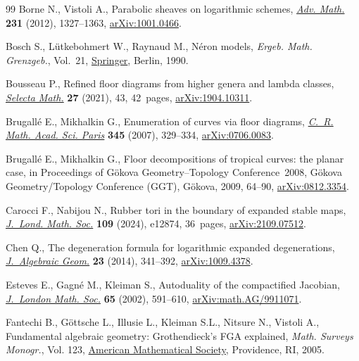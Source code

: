 \documentclass[pdftex]{sigma}
\numberwithin{equation}{section}
\theoremstyle{definition}
\begin{document}
\begin{thebibliography}{99}
Borne N., Vistoli A., Parabolic sheaves on logarithmic schemes,
 \href{https://doi.org/10.1016/j.aim.2012.06.015}{\textit{Adv. Math.}}
 \textbf{231} (2012), 1327--1363,
 \href{http://arxiv.org/abs/1001.0466}{arXiv:1001.0466}.

Bosch S., L\"utkebohmert W., Raynaud M., N\'eron models, \textit{Ergeb. Math.
 Grenzgeb.}, Vol.~21,
 \href{https://doi.org/10.1007/978-3-642-51438-8}{Springer}, Berlin, 1990.

Bousseau P., Refined floor diagrams from higher genera and lambda classes,
 \href{https://doi.org/10.1007/s00029-021-00667-w}{\textit{Selecta Math.}}
 \textbf{27} (2021), 43, 42~pages,
 \href{http://arxiv.org/abs/1904.10311}{arXiv:1904.10311}.

Brugall\'e E., Mikhalkin G., Enumeration of curves via floor diagrams,
 \href{https://doi.org/10.1016/j.crma.2007.07.026}{\textit{C.~R. Math. Acad.
 Sci. Paris}} \textbf{345} (2007), 329--334,
 \href{http://arxiv.org/abs/0706.0083}{arXiv:0706.0083}.

Brugall\'e E., Mikhalkin G., Floor decompositions of tropical curves: the
 planar case, in Proceedings of {G}\"okova {G}eometry--{T}opology
 {C}onference~2008, G\"okova Geometry/Topology Conference (GGT), G\"okova,
 2009, 64--90, \href{http://arxiv.org/abs/0812.3354}{arXiv:0812.3354}.

Carocci F., Nabijou N., Rubber tori in the boundary of expanded stable maps,
 \href{https://doi.org/10.1112/jlms.12874}{\textit{J.~Lond. Math. Soc.}}
 \textbf{109} (2024), e12874, 36~pages,
 \href{http://arxiv.org/abs/2109.07512}{arXiv:2109.07512}.

Chen Q., The degeneration formula for logarithmic expanded degenerations,
 \href{https://doi.org/10.1090/S1056-3911-2013-00614-1}{\textit{J.~Algebraic
 Geom.}} \textbf{23} (2014), 341--392,
 \href{http://arxiv.org/abs/1009.4378}{arXiv:1009.4378}.

Esteves E., Gagn\'e M., Kleiman S., Autoduality of the compactified {J}acobian,
 \href{https://doi.org/10.1112/S002461070100309X}{\textit{J.~London Math.
 Soc.}} \textbf{65} (2002), 591--610,
 \href{http://arxiv.org/abs/math.AG/9911071}{arXiv:math.AG/9911071}.

Fantechi B., G\"ottsche L., Illusie L., Kleiman S.L., Nitsure N., Vistoli A.,
 Fundamental algebraic geometry: {G}rothendieck's {FGA} explained,
 \textit{Math. Surveys Monogr.}, Vol. 123,
 \href{https://doi.org/10.1090/surv/123}{American Mathematical Society},
 Providence, RI, 2005.


\end{thebibliography}
\end{document}
